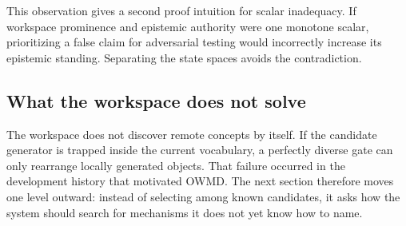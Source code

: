 This observation gives a second proof intuition for scalar inadequacy. If workspace prominence and epistemic authority were one monotone scalar, prioritizing a false claim for adversarial testing would incorrectly increase its epistemic standing. Separating the state spaces avoids the contradiction.

\subsection{What the workspace does not solve}

The workspace does not discover remote concepts by itself. If the candidate generator is trapped inside the current vocabulary, a perfectly diverse gate can only rearrange locally generated objects. That failure occurred in the development history that motivated OWMD. The next section therefore moves one level outward: instead of selecting among known candidates, it asks how the system should search for mechanisms it does not yet know how to name.
